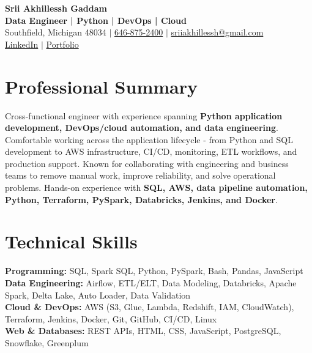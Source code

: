 \documentclass[letterpaper,10pt]{article}
\begin{document}
\fontsize{9.35pt}{10.45pt}\selectfont

\begin{center}
    {\LARGE \textbf{Srii Akhillessh Gaddam}} \\[-1pt]
    \textbf{Data Engineer | Python | DevOps | Cloud} \\[2pt]
    Southfield, Michigan 48034 $|$
    \href{tel:6468752400}{646-875-2400} $|$
    \href{mailto:sriiakhillessh@gmail.com}{sriiakhillessh@gmail.com} \\[1pt]
    \href{https://www.linkedin.com/in/srii-akhiilessh-gaddam-b48668191/}{LinkedIn} $|$
    \href{https://sriiakhillesshg.github.io/portfolio/}{Portfolio}
\end{center}
\vspace{-8pt}

\section{Professional Summary}
\small{Cross-functional engineer with experience spanning \textbf{Python application development, DevOps/cloud automation, and data engineering}. Comfortable working across the application lifecycle - from Python and SQL development to AWS infrastructure, CI/CD, monitoring, ETL workflows, and production support. Known for collaborating with engineering and business teams to remove manual work, improve reliability, and solve operational problems. Hands-on experience with \textbf{SQL, AWS, data pipeline automation, Python, Terraform, PySpark, Databricks, Jenkins, and Docker}.}

\section{Technical Skills}
\small{
\textbf{Programming:} SQL, Spark SQL, Python, PySpark, Bash, Pandas, JavaScript \\
\textbf{Data Engineering:} Airflow, ETL/ELT, Data Modeling, Databricks, Apache Spark, Delta Lake, Auto Loader, Data Validation \\
\textbf{Cloud \& DevOps:} AWS (S3, Glue, Lambda, Redshift, IAM, CloudWatch), Terraform, Jenkins, Docker, Git, GitHub, CI/CD, Linux \\
\textbf{Web \& Databases:} REST APIs, HTML, CSS, JavaScript, PostgreSQL, Snowflake, Greenplum
}

\end{document}
